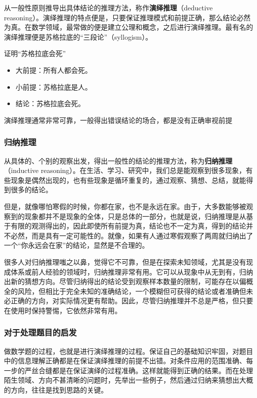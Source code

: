 从一般性原则推导出具体结论的推理方法，称作\textbf{演绎推理}（deductive reasoning）。演绎推理的特点便是，只要保证推理模式和前提正确，那么结论必然为真。在数学领域，最常做的便是建立公理和概念，之后进行演绎推理。最有名的演绎推理便是苏格拉底的“三段论”（syllogism）。

\begin{example}{证明“苏格拉底会死”}
\begin{itemize}
\item 大前提：所有人都会死。
\item 小前提：苏格拉底是人。
\item 结论：苏格拉底会死。
\end{itemize}
\end{example}

演绎推理通常非常可靠，一般得出错误结论的场合，都是没有正确审视前提

\subsubsection{归纳推理}

从具体的、个别的观察出发，得出一般性的结论的推理方法，称为\textbf{归纳推理}（inductive reasoning）。在生活、学习、研究中，我们总是能观察到很多现象，有些现象是偶然出现的，也有些现象是循环重复的，通过观察、猜想、总结，就能得到很多的结论。

但是，就像哪怕寒假的时候，你都在家，也不是永远在家。由于，大多数能够被观察到的现象都并不是现象的全体，只是总体的一部分，也就是说，归纳推理是从基于有限的观测得出的，因此即使所有前提为真，结论也不一定为真，得到的结论并不必然，而是具有一定可能性的。就像，如果有人通过寒假观察了两周就归纳出了一个“你永远会在家”的结论，显然是不合理的。

很多人对归纳推理嗤之以鼻，觉得它不可靠，但是在探索未知领域，尤其是没有现成体系或前人经验的领域时，归纳推理非常有用。它可以从现象中从无到有，归纳出新的猜想方向。尽管归纳得出的结论受到观察样本数量的限制，可能存在以偏概全的风险，但相比于完全未知的准确结论，一个模糊但可获得的结论或者准确但未必正确的方向，对实际情况更有帮助。因此，尽管归纳推理并不总是严格，但只要在使用时保持警惕，它依然非常有用。

\subsubsection{对于处理题目的启发}

做数学题的过程，也就是进行演绎推理的过程。保证自己的基础知识牢固，对题目中的信息理解正确都是在保证演绎推理的前提不出错。对条件应用的范围准确、每一步的严丝合缝都是在保证演绎的过程准确。这样就能得到正确的结果。而在处理陌生领域、方向不甚清晰的问题时，先举出一些例子，然后通过归纳来猜想出大概的方向，往往是找到思路的关键。
